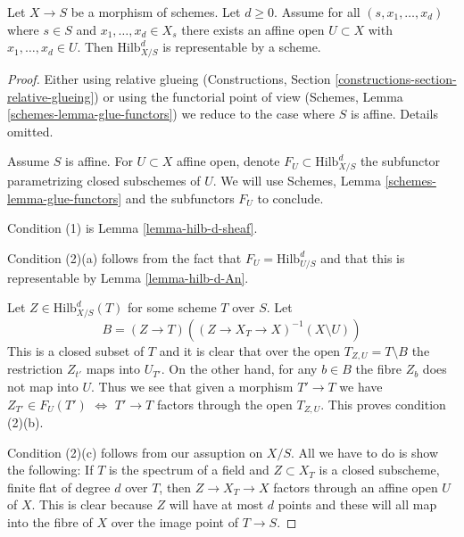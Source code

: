 \begin{proposition}
\label{proposition-hilb-d-representable}
Let $X \to S$ be a morphism of schemes. Let $d \geq 0$. Assume
for all $(s, x_1, \ldots, x_d)$ where $s \in S$ and
$x_1, \ldots, x_d \in X_s$ there exists an affine open $U \subset X$
with $x_1, \ldots, x_d \in U$. Then $\text{Hilb}^d_{X/S}$ is
representable by a scheme.
\end{proposition}

\begin{proof}
Either using relative glueing (Constructions, Section
\ref{constructions-section-relative-glueing}) or using
the functorial point of view
(Schemes, Lemma \ref{schemes-lemma-glue-functors})
we reduce to the case where $S$ is affine. Details omitted.

\medskip\noindent
Assume $S$ is affine. For $U \subset X$ affine open, denote
$F_U \subset \text{Hilb}^d_{X/S}$ the subfunctor parametrizing
closed subschemes of $U$. We will use
Schemes, Lemma \ref{schemes-lemma-glue-functors}
and the subfunctors $F_U$ to conclude.

\medskip\noindent
Condition (1) is Lemma \ref{lemma-hilb-d-sheaf}.

\medskip\noindent
Condition (2)(a) follows from the fact that
$F_U = \text{Hilb}^d_{U/S}$ and that this is representable
by Lemma \ref{lemma-hilb-d-An}.

\medskip\noindent
Let $Z \in \text{Hilb}^d_{X/S}(T)$ for some scheme $T$ over $S$. Let
$$
B = (Z \to T)\left((Z \to X_T \to X)^{-1}(X \setminus U)\right)
$$
This is a closed subset of $T$ and it is clear that over the open
$T_{Z, U} = T \setminus B$ the restriction $Z_{t'}$ maps into $U_{T'}$.
On the other hand, for any $b \in B$ the fibre $Z_b$ does not map
into $U$. Thus we see that given a morphism $T' \to T$ we
have $Z_{T'} \in F_U(T')$ $\Leftrightarrow$ $T' \to T$ factors through
the open $T_{Z, U}$. This proves condition (2)(b).

\medskip\noindent
Condition (2)(c) follows from our assuption on $X/S$. All we have
to do is show the following: If $T$ is the spectrum of a field
and $Z \subset X_T$ is a closed subscheme, finite flat of degree
$d$ over $T$, then $Z \to X_T \to X$ factors through an affine open
$U$ of $X$. This is clear because $Z$ will have at most $d$ points
and these will all map into the fibre of $X$ over the image point
of $T \to S$.
\end{proof}


